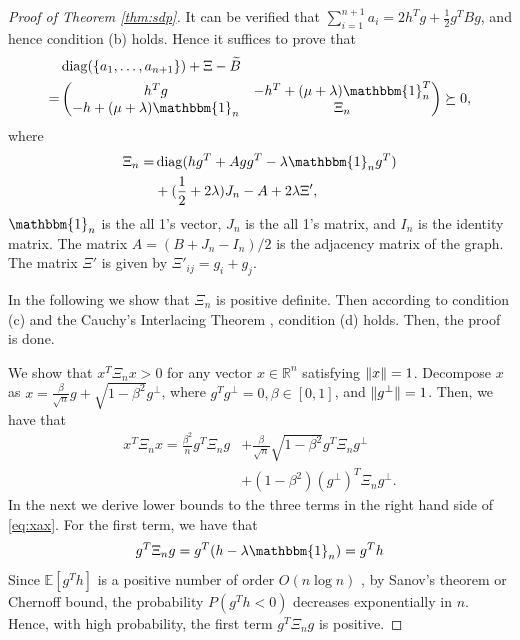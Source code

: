 \documentclass[conference]{IEEEtran}
\DeclarePairedDelimiter\norm{\lVert}{\rVert}
\DeclareMathOperator{\diag}{diag}
\begin{document}
\begin{proof}[Proof of Theorem \ref{thm:sdp}]
	It can be verified that $\sum_{i=1}^{n+1} a_i = 2h^Tg +\frac{1}{2} g^T B g$, and hence condition (b) holds.
	Hence it suffices to prove that
	\begin{align}
		&\diag(\{a_1, \dots, a_{n+1}\}) + \Xi - \widetilde{B} \nonumber\\
		=& \begin{pmatrix} h^T g & -h^T +(\mu + \lambda)\mathbbm{1}_n^T \\
			-h+(\mu + \lambda )\mathbbm{1}_n & \Xi_n \end{pmatrix}
		\succeq 0, 
	\end{align}
	where
	\begin{align}\label{eq:Xi_n}
		\Xi_n =&\diag(hg^T + Agg^T -\lambda \mathbbm{1}_ng^T)  \nonumber\\
		&+ (\frac{1}{2} +2\lambda) J_n  - A + 2\lambda \Xi',
	\end{align}
	$\mathbbm{1}_n$ is the all 1's vector, $J_n$ is the all 1's matrix, and $I_n$ is the identity matrix. The matrix $A=(B+J_n-I_n)/2$ is the adjacency matrix of the graph.
	The matrix $\Xi'$ is given by $\Xi'_{ij}=g_i + g_j$.
	
	In the following we show that $\Xi_n$ is positive definite. Then according to condition (c) and the
	Cauchy's Interlacing Theorem \cite{hwang}, condition (d) holds.
	Then, the proof is done.
	
	We show that $x^T \Xi_n x>0$ for any vector $x \in \mathbb{R}^n$ satisfying $\norm{x}=1$. Decompose $x$ as $x=\frac{\beta}{\sqrt{n}} g
	+ \sqrt{1-\beta^2} g^{\perp}$, where $g^Tg^{\perp}=0, \beta \in [0,1]$, and $\norm{g^{\perp}}=1$. Then, we have that 
	\begin{align}
		x^T \Xi_n x = \frac{\beta^2}{n} g^T \Xi_n g  &
		+		\frac{\beta}{\sqrt{n}}\sqrt{1-\beta^2} g^T \Xi_n g^{\perp}
		\nonumber\\\label{eq:xax}
		&+
		(1-\beta^2)(g^{\perp})^T \Xi_n g^{\perp}. 
	\end{align}
	In the next we derive lower bounds to the three terms in the right hand side of \eqref{eq:xax}.
	For the first term, we have that
	\begin{align*}
		g^T \Xi_n g = g^T(h -\lambda \mathbbm{1}_n)   = g^T h
	\end{align*}
	Since $\mathbb{E}[g^T h]$ is a positive number of order $O(n\log n)$ ,
	by Sanov's theorem or Chernoff bound, the probability 
	$P(g^T h < 0)$ decreases exponentially in $n$. Hence, with high probability, the first term $g^T \Xi_n g$ is positive.
	

\end{proof}
\end{document}
